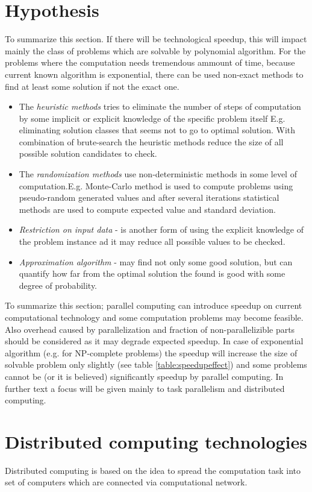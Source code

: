 \section{Hypothesis}
To summarize this section. If there will be technological speedup, this will impact mainly the class of problems which are solvable by polynomial algorithm. For the problems where the computation needs tremendous ammount of time, because current known algorithm is exponential, there can be used non-exact methods to find at least some solution if not the exact one. 
\begin{itemize}
\item{The \emph{heuristic methods} tries to eliminate the number of steps of computation by some implicit or explicit knowledge of the specific problem itself E.g. eliminating solution classes that seems not to go to optimal solution. With combination of brute-search the heuristic methods reduce the size of all possible solution candidates to check.}
\item{The \emph{randomization methods} use non-deterministic methods in some level of computation.E.g. Monte-Carlo method is used to compute problems using pseudo-random generated values and after several iterations statistical methods are used to compute expected value and standard deviation. }
\item{\emph{Restriction on input data} - is another form of using the explicit knowledge of the problem instance ad it may reduce all possible values to be checked. }
\item{\emph{Approximation algorithm} - may find not only some good solution, but can quantify how far from the optimal solution the found is good with some degree of probability.}
\end{itemize}

To summarize this section; parallel computing can introduce speedup on current computational technology and some computation problems may become feasible.
Also overhead caused by parallelization and fraction of non-parallelizible parts should be considered as it may degrade expected speedup.
In case of exponential algorithm (e.g. for NP-complete problems) the speedup will increase the size of solvable problem only slightly (see table \ref{table:speedupeffect}) and some problems cannot be (or it is believed) significantly speedup by parallel computing. 
In further text a focus will be given mainly to task parallelism and distributed computing. 

\section{Distributed computing technologies}
\label{sec:distributed}

Distributed computing is based on the idea to spread the computation task into set of computers which are connected via computational network.
